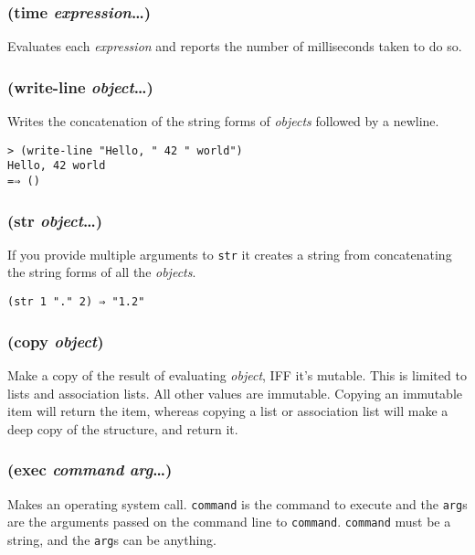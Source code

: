 \documentclass{article}
\begin{document}
\subsubsection{(time \emph{expression}\ldots{})}

Evaluates each \emph{expression} and reports the number of milliseconds taken to do so.

\subsubsection{(write-line \emph{object}\ldots{})}

Writes the concatenation of the string forms of \emph{objects} followed by a newline.

\begin{verbatim}
> (write-line "Hello, " 42 " world")
Hello, 42 world
=⇒ ()
\end{verbatim}

\subsubsection{(str \emph{object}\ldots{})}

If you provide multiple arguments to \verb|str| it creates a string from
concatenating the string forms of all the \emph{objects}.

\begin{verbatim}
(str 1 "." 2) ⇒ "1.2"
\end{verbatim}

\subsubsection{(copy \emph{object})}

Make a copy of the result of evaluating \emph{object}, IFF it’s mutable. This is limited to
lists and association lists. All other values are immutable. Copying an immutable item will
return the item, whereas copying a list or association list will make a deep copy of the
structure, and return it.

\subsubsection{(exec \emph{command} \emph{arg}\ldots{})}

Makes an operating system call. \verb|command| is the command to execute and the
\verb|arg|s are the arguments passed on the command line to \verb|command|.
\verb|command| must be a string, and the \verb|arg|s can be anything.
\end{document}
